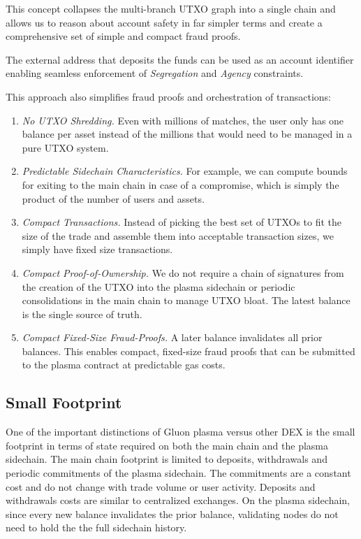 \documentclass[12pt,a4paper]{article}
\begin{document}
This concept collapses the multi-branch UTXO graph into a single chain and allows us to reason about account safety in far simpler terms and create a comprehensive set of simple and compact fraud proofs. 

The external address that deposits the funds can be used as an account identifier enabling seamless enforcement of \emph{Segregation} and \emph{Agency} constraints. 

This approach also simplifies fraud proofs and orchestration of transactions:

\begin{enumerate}
    \item \emph{No UTXO Shredding.} Even with millions of matches, the user only has one balance per asset instead of the millions that would need to be managed in a pure UTXO system. 
    \item \emph{Predictable  Sidechain Characteristics.} For example, we can compute bounds for exiting to the main chain in case of a compromise, which is simply the product of the number of users and assets. 
    \item \emph{Compact Transactions.} Instead of picking the best set of UTXOs to fit the size of the trade and assemble them into acceptable transaction sizes, we simply have fixed size transactions. 
    \item \emph{Compact Proof-of-Ownership.} We do not require a chain of signatures from the creation of the UTXO into the plasma sidechain or periodic consolidations in the main chain to manage UTXO bloat. The latest balance is the single source of truth.
    \item \emph{Compact Fixed-Size Fraud-Proofs.} A later balance invalidates all prior balances. This enables compact, fixed-size fraud proofs that can be submitted to the plasma contract at predictable gas costs. 
\end{enumerate}

\subsection{Small Footprint}
One of the important distinctions of Gluon plasma versus other DEX is the small footprint in terms of state required on both the main chain and the plasma sidechain. The main chain footprint is limited to deposits, withdrawals and periodic commitments of the plasma sidechain. The commitments are a constant cost and do not change with trade volume or user activity. Deposits and withdrawals costs are similar to centralized exchanges. 
On the plasma sidechain, since every new balance invalidates the prior balance, validating nodes do not need to hold the the full sidechain history. 
\end{document}

